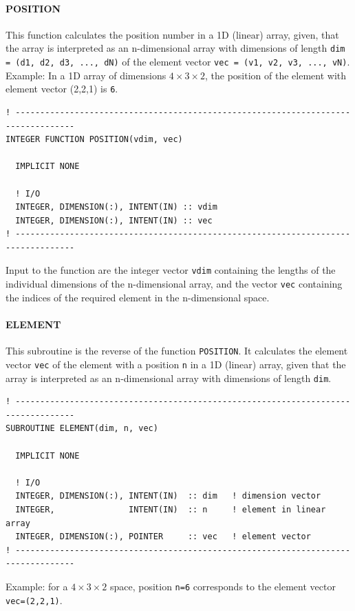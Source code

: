 \documentclass[11pt,twoside]{article}
\begin{document}
\paragraph{POSITION\\ \label{POS}}
This function calculates the position number in a 1D (linear) array, given,
that the array is interpreted as an n-dimensional array with dimensions 
of length \verb|dim = (d1, d2, d3, ..., dN)| of the element
vector \verb|vec = (v1, v2, v3, ..., vN)|. Example: In a 1D array of
dimensions $4\times 3 \times 2$, the position of the element with
element vector (2,2,1) is \verb|6|.

\begin{verbatim}
! ----------------------------------------------------------------------------------
INTEGER FUNCTION POSITION(vdim, vec)

  IMPLICIT NONE

  ! I/O
  INTEGER, DIMENSION(:), INTENT(IN) :: vdim
  INTEGER, DIMENSION(:), INTENT(IN) :: vec
! ----------------------------------------------------------------------------------
\end{verbatim}
Input to the function are the integer vector \verb|vdim| containing the lengths
 of the individual dimensions of the n-dimensional array, and the vector 
\verb|vec| containing the indices of the required element
 in the n-dimensional space.
\paragraph{ELEMENT\\\label{ELEMENT}}
This subroutine is the reverse of the function \verb|POSITION|.
It calculates the element vector \verb|vec| of the element with a
position
\verb|n| in a 1D (linear) array, given that the array is interpreted as 
an n-dimensional array with dimensions of length \verb|dim|.
\begin{verbatim}
! ----------------------------------------------------------------------------------
SUBROUTINE ELEMENT(dim, n, vec)

  IMPLICIT NONE

  ! I/O
  INTEGER, DIMENSION(:), INTENT(IN)  :: dim   ! dimension vector
  INTEGER,               INTENT(IN)  :: n     ! element in linear array
  INTEGER, DIMENSION(:), POINTER     :: vec   ! element vector
! ----------------------------------------------------------------------------------
\end{verbatim}
Example: for a $4\times 3 \times 2$ space, position \verb|n=6|
corresponds to the element vector \verb|vec=(2,2,1)|.
\end{document}
